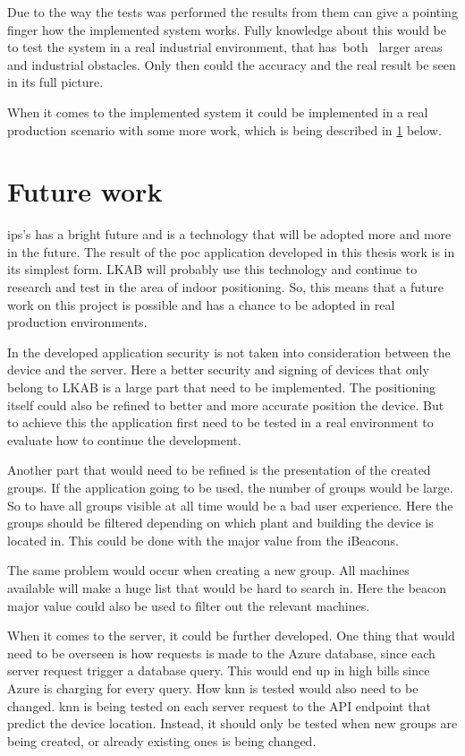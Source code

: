 Due to the way the tests was performed the results from them can give a pointing finger how the implemented system works.
Fully knowledge about this would be to test the system in a real industrial environment, that has both  larger areas and industrial obstacles.
Only then could the accuracy and the real result be seen in its full picture.

\bigskip

When it comes to the implemented system it could be implemented in a real production scenario with some more work, which is being described in \cref{sec:conclusionFutureWork} below.


\section{Future work}\label{sec:conclusionFutureWork}
\Acrshort{ips}'s has a bright future and is a technology that will be adopted more and more in the future.
The result of the \acrshort{poc} application developed in this thesis work is in its simplest form.
LKAB will probably use this technology and continue to research and test in the area of indoor positioning.
So, this means that a future work on this project is possible and has a chance to be adopted in real production environments.

\bigskip

In the developed application security is not taken into consideration between the device and the server.
Here a better security and signing of devices that only belong to LKAB is a large part that need to be implemented.
The positioning itself could also be refined to better and more accurate position the device. 
But to achieve this the application first need to be tested in a real environment to evaluate how to continue the development.

\bigskip

Another part that would need to be refined is the presentation of the created groups.
If the application going to be used, the number of groups would be large.
So to have all groups visible at all time would be a bad user experience.
Here the groups should be filtered depending on which plant and building the device is located in.
This could be done with the major value from the iBeacons.

\bigskip

The same problem would occur when creating a new group.
All machines available will make a huge list that would be hard to search in.
Here the beacon major value could also be used to filter out the relevant machines.

\bigskip

When it comes to the server, it could be further developed.
One thing that would need to be overseen is how requests is made to the Azure database, since each server request trigger a database query.
This would end up in high bills since Azure is charging for every query.
How \acrfull{knn} is tested would also need to be changed.
\acrshort{knn} is being tested on each server request to the API endpoint that predict the device location.
Instead, it should only be tested when new groups are being created, or already existing ones is being changed.

